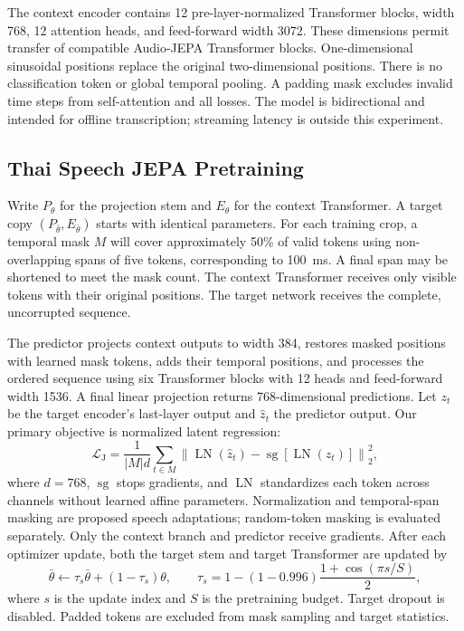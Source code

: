 The context encoder contains 12 pre-layer-normalized Transformer blocks, width 768, 12 attention heads, and feed-forward width 3072. These dimensions permit transfer of compatible Audio-JEPA Transformer blocks. One-dimensional sinusoidal positions replace the original two-dimensional positions. There is no classification token or global temporal pooling. A padding mask excludes invalid time steps from self-attention and all losses. The model is bidirectional and intended for offline transcription; streaming latency is outside this experiment.

\subsection{Thai Speech JEPA Pretraining}
Write $P_\theta$ for the projection stem and $E_\theta$ for the context Transformer. A target copy $(P_{\bar\theta},E_{\bar\theta})$ starts with identical parameters. For each training crop, a temporal mask $M$ will cover approximately 50\% of valid tokens using non-overlapping spans of five tokens, corresponding to 100~ms. A final span may be shortened to meet the mask count. The context Transformer receives only visible tokens with their original positions. The target network receives the complete, uncorrupted sequence.

The predictor projects context outputs to width 384, restores masked positions with learned mask tokens, adds their temporal positions, and processes the ordered sequence using six Transformer blocks with 12 heads and feed-forward width 1536. A final linear projection returns 768-dimensional predictions. Let $z_t$ be the target encoder's last-layer output and $\hat z_t$ the predictor output. Our primary objective is normalized latent regression:
\begin{equation}
\mathcal{L}_{\mathrm{J}}=
\frac{1}{|M|d}\sum_{t\in M}
\left\|\operatorname{LN}(\hat z_t)-
\operatorname{sg}\!\left[\operatorname{LN}(z_t)\right]\right\|_2^2,
\label{eq:jepa}
\end{equation}
where $d=768$, $\operatorname{sg}$ stops gradients, and $\operatorname{LN}$ standardizes each token across channels without learned affine parameters. Normalization and temporal-span masking are proposed speech adaptations; random-token masking is evaluated separately. Only the context branch and predictor receive gradients. After each optimizer update, both the target stem and target Transformer are updated by
\begin{equation}
\bar\theta\leftarrow\tau_s\bar\theta+(1-\tau_s)\theta,
\qquad
\tau_s=1-(1-0.996)\frac{1+\cos(\pi s/S)}{2},
\end{equation}
where $s$ is the update index and $S$ is the pretraining budget. Target dropout is disabled. Padded tokens are excluded from mask sampling and target statistics.

